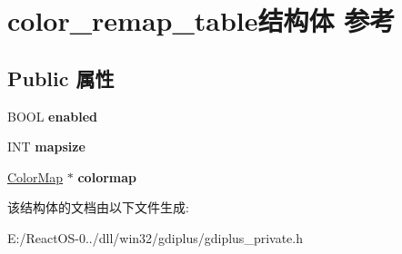 \hypertarget{structcolor__remap__table}{}\section{color\+\_\+remap\+\_\+table结构体 参考}
\label{structcolor__remap__table}
\subsection*{Public 属性}
\begin{DoxyCompactItemize}
\item 
\mbox{\label{structcolor__remap__table_a1af14fd90f3d7b06ace4b8fd80e06ec3}} 
B\+O\+OL {\bfseries enabled}
\item 
\mbox{\label{structcolor__remap__table_aef148b21b36621463e4ab6d0a6b4aada}} 
I\+NT {\bfseries mapsize}
\item 
\mbox{\label{structcolor__remap__table_a197dc73967b68afb263099df0eea8acd}} 
\hyperlink{struct_color_map}{Color\+Map} $\ast$ {\bfseries colormap}
\end{DoxyCompactItemize}


该结构体的文档由以下文件生成\+:\begin{DoxyCompactItemize}
\item 
E\+:/\+React\+O\+S-\/0../dll/win32/gdiplus/gdiplus\+\_\+private.\+h\end{DoxyCompactItemize}

